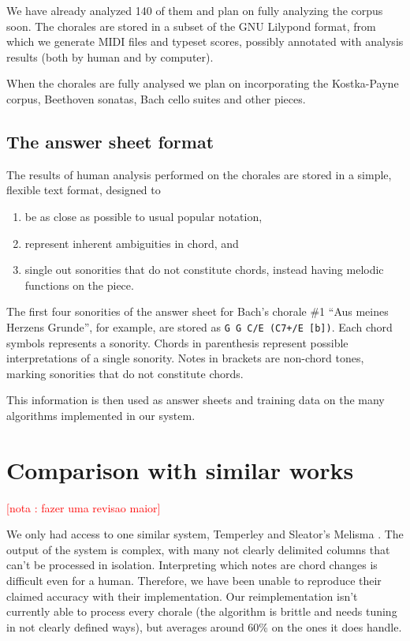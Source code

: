 \documentclass{article}
\newcounter{notacounter}
\newcommand{\nota}[1]{
  \addtocounter{notacounter}{1}
  \textcolor{red}{[nota \arabic{notacounter}: #1]}
}
\begin{document}
We have already analyzed 140 of them and plan on fully analyzing the
corpus soon. The chorales are stored in a subset of the GNU Lilypond
\cite{nienhuys.ea:lilypond} format, from which we generate MIDI files and
typeset scores, possibly annotated with analysis results (both by
human and by computer).

When the chorales are fully analysed we plan on incorporating the
Kostka-Payne \cite{kostka.ea:tonal} corpus, Beethoven sonatas, Bach
cello suites and other pieces.

\subsection{The answer sheet format}
\label{sec:formato-dos-acordes}

The results of human analysis performed on the chorales are stored in
a simple, flexible text format, designed to

\begin{enumerate}
\item be as close as possible to usual popular notation,
\item represent inherent ambiguities in chord, and
\item single out sonorities that do not constitute chords, instead
  having melodic functions on the piece.
\end{enumerate}

The first four sonorities of the answer sheet for Bach's chorale \#1
``Aus meines Herzens Grunde'', for example, are stored as \texttt{G G
  C/E (C7+/E [b])}. Each chord symbols represents a sonority. Chords
in parenthesis represent possible interpretations of a single
sonority. Notes in brackets are non-chord tones, marking sonorities
that do not constitute chords.

This information is then used as answer sheets and training data on the
many algorithms implemented in our system.

\section{Comparison with similar works}
\label{sec:differences-from-similar-software}

\nota{fazer uma revisao maior}

We only had access to one similar system, Temperley and Sleator's
Melisma \cite{temperley.ea:modeling}. The output of the system is
complex, with many not clearly delimited columns that can't be
processed in isolation. Interpreting which notes are chord changes is
difficult even for a human. Therefore, we have been unable to
reproduce their claimed accuracy with their implementation. Our
reimplementation isn't currently able to process every chorale (the
algorithm is brittle and needs tuning in not clearly defined ways),
but averages around 60\% on the ones it does handle.
\end{document}
